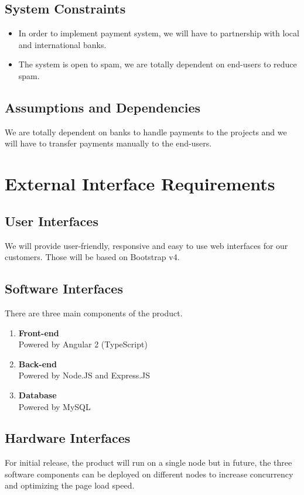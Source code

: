 \documentclass{scrreprt}
\begin{document}
\section{System Constraints}
\begin{itemize}
  \item In order to implement payment system, we will have to partnership with local and international banks.
  \item The system is open to spam, we are totally dependent on end-users to reduce spam.
\end{itemize}

\section{Assumptions and Dependencies}
We are totally dependent on banks to handle payments to the projects and we will have to transfer payments manually to the end-users.

\chapter{External Interface Requirements}

\section{User Interfaces}
We will provide user-friendly, responsive and easy to use web interfaces for our customers. Those will be based on Bootstrap v4.

\section{Software Interfaces}
There are three main components of the product.

\begin{enumerate}
    \item \textbf{Front-end}\\
        Powered by Angular 2 (TypeScript)
    \item \textbf{Back-end}\\
        Powered by Node.JS and Express.JS
    \item \textbf{Database}\\
        Powered by MySQL
\end{enumerate}

\section{Hardware Interfaces}
For initial release, the product will run on a single node but in future, the three software components can be deployed on different nodes to increase concurrency and optimizing the page load speed.
\end{document}
